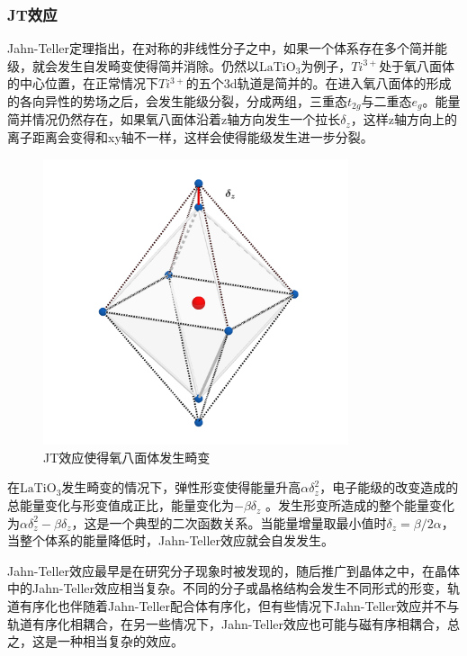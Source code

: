 \subsubsection{JT效应}
Jahn-Teller定理指出，在对称的非线性分子之中，如果一个体系存在多个简并能级，就会发生自发畸变使得简并消除。仍然以$\text{LaTiO}_{3}$为例子，$Ti^{3+}$处于氧八面体的中心位置，在正常情况下$Ti^{3+}$的五个3d轨道是简并的。在进入氧八面体的形成的各向异性的势场之后，会发生能级分裂，分成两组，三重态$t_{2g}$与二重态$e_{g}$。能量简并情况仍然存在，如果氧八面体沿着z轴方向发生一个拉长$\delta_{z}$，这样z轴方向上的离子距离会变得和xy轴不一样，这样会使得能级发生进一步分裂。

\begin{figure}[h]
    \centering
\includegraphics[width=0.8\textwidth]{./pic/p002.png}
\caption{JT效应使得氧八面体发生畸变}

\label{dogp02}
\end{figure}

在$\text{LaTiO}_{3}$发生畸变的情况下，弹性形变使得能量升高$\alpha \delta_{z}^{2}$，电子能级的改变造成的总能量变化与形变值成正比，能量变化为$-\beta \delta_{z}$
。发生形变所造成的整个能量变化为$\alpha \delta_{z}^{2} -\beta \delta_{z}$，这是一个典型的二次函数关系。当能量增量取最小值时$\delta_{z}=\beta /2\alpha $，当整个体系的能量降低时，Jahn-Teller效应就会自发发生。

Jahn-Teller效应最早是在研究分子现象时被发现的，随后推广到晶体之中，在晶体中的Jahn-Teller效应相当复杂。不同的分子或晶格结构会发生不同形式的形变，轨道有序化也伴随着Jahn-Teller配合体有序化，但有些情况下Jahn-Teller效应并不与轨道有序化相耦合，在另一些情况下，Jahn-Teller效应也可能与磁有序相耦合，总之，这是一种相当复杂的效应。

